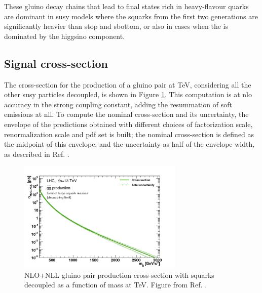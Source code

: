 These gluino decay chains that lead to final states rich in heavy-flavour quarks are dominant in \gls{susy} models where the squarks 
from the first two generations are significantly heavier than stop and sbottom, or also in cases when the \ninoone is dominated by the higgsino component. 

\subsection{Signal cross-section}
\label{sec:strong:signalxsec}

The cross-section for the production of a gluino pair at \cmtre TeV, considering all the other \gls{susy} particles decoupled, is shown in Figure 
\ref{fig:strong:xsec}. This computation is at \gls{nlo} accuracy in the strong coupling constant, adding the resummation of soft emissions at \gls{nll}.
To compute the nominal cross-section and its uncertainty, the envelope of the predictions obtained with different choices of factorization scale, 
renormalization scale and \gls{pdf} set is built; the nominal cross-section is defined as the midpoint of this envelope, and the uncertainty as 
half of the envelope width, as described in Ref. \cite{Borschensky:2014cia}.


\begin{figure}[h]
\centering 
\includegraphics[width=0.70\textwidth]{figures/strong_prod/diagrams/XSectionPlots_13TeV_Gluino_decouplingLimit_xsec_gg_200_3050}
\caption{NLO+NLL gluino pair production cross-section with squarks decoupled as a function of mass at \cmtre TeV. Figure from Ref. \cite{Borschensky:2014cia}.
}\label{fig:strong:xsec}
\end{figure}



